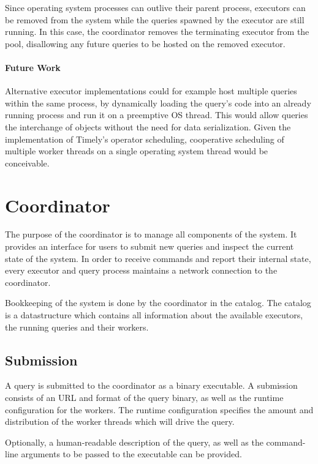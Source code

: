 Since operating system processes can outlive their parent process, executors can
be removed from the system while the queries spawned by the executor are still
running. In this case, the coordinator removes the terminating executor from
the pool, disallowing any future queries to be hosted on the removed executor.

\paragraph{Future Work}

Alternative executor implementations could for example host multiple queries
within the same process, by dynamically loading the query's code into an already
running process and run it on a preemptive OS thread. This would allow queries
the interchange of objects without the need for data serialization. Given
the implementation of Timely's operator scheduling, cooperative scheduling
of multiple worker threads on a single operating system thread would be
conceivable.

\section{Coordinator}

The purpose of the coordinator is to manage all components of the system. It
provides an interface for users to submit new queries and inspect the current
state of the system. In order to receive commands and report their internal state,
every executor and query process maintains a network connection to the coordinator.

Bookkeeping of the system is done by the coordinator in the catalog. The
catalog is a datastructure which contains all information about the available
executors, the running queries and their workers. 



\subsection{Submission}

A query is submitted to the coordinator as a binary executable. A submission
consists of an URL and format of the query binary, as well as the runtime
configuration for the workers. The runtime configuration specifies the amount
and distribution of the worker threads which will drive the query.

Optionally, a human-readable description of the query,
as well as the command-line arguments to be passed to the executable can be
provided. 

